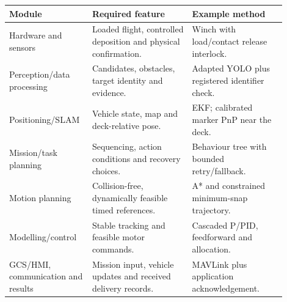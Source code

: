 {\small\renewcommand{\arraystretch}{1.22}
\begin{tabular}{>{\raggedright\arraybackslash}p{0.24\linewidth}>{\raggedright\arraybackslash}p{0.34\linewidth}>{\raggedright\arraybackslash}p{0.32\linewidth}}
\toprule
\textbf{Module} & \textbf{Required feature} & \textbf{Example method} \\
\midrule
Hardware and sensors & Loaded flight, controlled deposition and physical confirmation. & Winch with load/contact release interlock. \\
Perception/data processing & Candidates, obstacles, target identity and evidence. & Adapted YOLO plus registered identifier check. \\
Positioning/SLAM & Vehicle state, map and deck-relative pose. & EKF; calibrated marker PnP near the deck. \\
Mission/task planning & Sequencing, action conditions and recovery choices. & Behaviour tree with bounded retry/fallback. \\
Motion planning & Collision-free, dynamically feasible timed references. & A* and constrained minimum-snap trajectory. \\
Modelling/control & Stable tracking and feasible motor commands. & Cascaded P/PID, feedforward and allocation. \\
GCS/HMI, communication and results & Mission input, vehicle updates and received delivery records. & MAVLink plus application acknowledgement. \\
\bottomrule
\end{tabular}}
